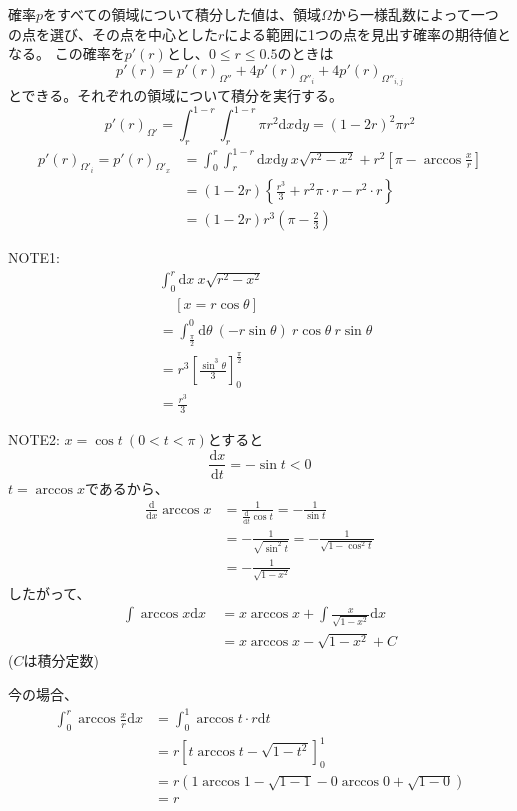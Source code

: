 確率$p$をすべての領域について積分した値は、領域$\Omega$から一様乱数によって一つの点を選び、その点を中心とした$r$による範囲に1つの点を見出す確率の期待値となる。
この確率を$p'(r)$とし、$0\le r \le 0.5$のときは
\[p'(r) = p'(r)_{\Omega''} + 4p'(r)_{\Omega''_{i}} + 4p'(r)_{\Omega''_{i,j}}\]
とできる。それぞれの領域について積分を実行する。
\[p'(r)_{\Omega'} = \int_{r}^{1-r} \int_{r}^{1-r}\pi r^{2}\mathrm{d}x\mathrm{d}y = (1-2r)^{2}\pi r^{2}\]
\begin{align}
p'(r)_{\Omega'_{i}} = p'(r)_{\Omega'_{x}} &= \int_{0}^{r} \int_{r}^{1-r}\mathrm{d}x\mathrm{d}y\ x\sqrt{r^{2}-x^{2}} + r^{2}\left[\pi - \arccos\frac{x}{r}\right]\nonumber \\
&= (1-2r)\left\{ \frac{r^{3}}{3} + r^{2}\pi\cdot r - r^{2}\cdot r \right\}\nonumber \\
&= (1-2r)r^{3}\left( \pi-\frac{2}{3} \right)
\end{align}

NOTE1:
\begin{align}
&\int_{0}^{r}\mathrm{d}x\ x\sqrt{r^{2}-x^{2}} \nonumber \\
&\ \ \ \ \ \left[x = r\cos \theta \right]\nonumber \\
&= \int_{\frac{\pi}{2}}^{0}\mathrm{d}\theta\ (-r\sin\theta)\ r\cos\theta\ r\sin\theta\nonumber \\
&= r^{3}\left[ \frac{\sin^{3}\theta}{3}\right]^{\frac{\pi}{2}}_{0} \nonumber \\
&= \frac{r^{3}}{3}
\end{align}

NOTE2:
$x = \cos t \ (0< t< \pi)$とすると
\[\frac{\mathrm{d}x}{\mathrm{d}t} = - \sin t < 0\]
$t = \arccos x$であるから、
\begin{align}
\frac{\mathrm{d}}{\mathrm{d}x}\arccos x &= \frac{1}{\frac{\mathrm{d}}{\mathrm{d}t}\cos t} = -\frac{1}{\sin t}\nonumber \\
&=- \frac{1}{\sqrt{\sin^{2}t}} = - \frac{1}{\sqrt{1- \cos^{2}t}} \nonumber \\
&= - \frac{1}{\sqrt{1- x^{2}}}
\end{align}
したがって、
\begin{align}
\int \arccos x \mathrm{d}x\  &= x\arccos x + \int \frac{x}{\sqrt{1-x^{2}}}\mathrm{d}x\nonumber \\
&=x\arccos x - \sqrt{1-x^{2}} + C
\end{align}
($C$は積分定数)

今の場合、
\begin{align}
\int^{r}_{0} \arccos \frac{x}{r} \mathrm{d}x &= \int^{1}_{0}\arccos t \cdot r\mathrm{d}t\nonumber \\
&= r \left[ t \arccos t - \sqrt{1-t^{2}} \right]^{1}_{0}\nonumber \\
&= r ( 1\arccos1 -\sqrt{1-1} - 0 \arccos0 + \sqrt{1-0})\nonumber \\
&= r
\end{align}

